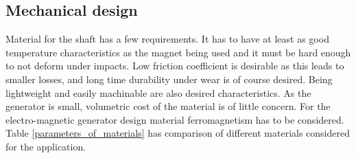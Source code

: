 \subsection{Mechanical design}
Material for the shaft has a few requirements. It has to have at least as good temperature characteristics as the magnet being used and it must be hard enough to not deform under impacts. Low friction coefficient is desirable as this leads to smaller losses, and long time durability under wear is of course desired. Being lightweight and easily machinable are also desired characteristics. As the generator is small, volumetric cost of the material is of little concern. For the electro-magnetic generator design material ferromagnetism has to be considered. Table \ref{parameters_of_materials} has comparison of different materials considered for the application.

\begin{table}[htb]
\caption{\label{parameters_of_materials} Materials for the shaft of generator \cite{PlasticsInternational2015}, \cite{Etra}.}
\begin{center}
\end{center}
\end{table}





